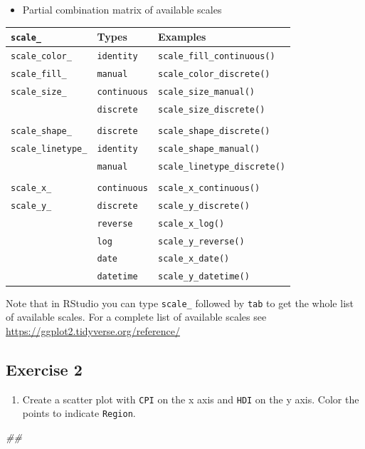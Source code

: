 \documentclass[
]{book}
\newenvironment{Shaded}{\begin{snugshade}}{\end{snugshade}}
\newcommand{\CommentTok}[1]{\textcolor[rgb]{0.56,0.35,0.01}{\textit{#1}}}
\providecommand{\tightlist}{%
  \setlength{\itemsep}{0pt}\setlength{\parskip}{0pt}}
\begin{document}
\begin{itemize}
\tightlist
\item
  Partial combination matrix of available scales
\end{itemize}

\begin{longtable}[]{@{}lll@{}}
\toprule
\texttt{scale\_} & Types & Examples\tabularnewline
\midrule
\endhead
\texttt{scale\_color\_} & \texttt{identity} & \texttt{scale\_fill\_continuous()}\tabularnewline
\texttt{scale\_fill\_} & \texttt{manual} & \texttt{scale\_color\_discrete()}\tabularnewline
\texttt{scale\_size\_} & \texttt{continuous} & \texttt{scale\_size\_manual()}\tabularnewline
& \texttt{discrete} & \texttt{scale\_size\_discrete()}\tabularnewline
& &\tabularnewline
\texttt{scale\_shape\_} & \texttt{discrete} & \texttt{scale\_shape\_discrete()}\tabularnewline
\texttt{scale\_linetype\_} & \texttt{identity} & \texttt{scale\_shape\_manual()}\tabularnewline
& \texttt{manual} & \texttt{scale\_linetype\_discrete()}\tabularnewline
& &\tabularnewline
\texttt{scale\_x\_} & \texttt{continuous} & \texttt{scale\_x\_continuous()}\tabularnewline
\texttt{scale\_y\_} & \texttt{discrete} & \texttt{scale\_y\_discrete()}\tabularnewline
& \texttt{reverse} & \texttt{scale\_x\_log()}\tabularnewline
& \texttt{log} & \texttt{scale\_y\_reverse()}\tabularnewline
& \texttt{date} & \texttt{scale\_x\_date()}\tabularnewline
& \texttt{datetime} & \texttt{scale\_y\_datetime()}\tabularnewline
\bottomrule
\end{longtable}

Note that in RStudio you can type \texttt{scale\_} followed by \texttt{tab} to get the whole list of available scales. For a complete list of available scales see \url{https://ggplot2.tidyverse.org/reference/}

\hypertarget{exercise-2-1}{%
\subsection{Exercise 2}\label{exercise-2-1}}

\begin{enumerate}
\def\labelenumi{\arabic{enumi}.}
\tightlist
\item
  Create a scatter plot with \texttt{CPI} on the x axis and \texttt{HDI} on the y axis. Color the points to indicate \texttt{Region}.
\end{enumerate}

\begin{Shaded}
\begin{Highlighting}[]
\CommentTok{\#\# }
\end{Highlighting}
\end{Shaded}
\end{document}
